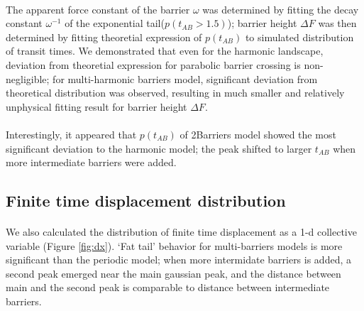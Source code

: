 \documentclass[11pt, a4paper]{article}
\begin{document}
\paragraph{}The apparent force constant of the barrier $\omega$ was determined by fitting the decay constant $\omega^{-1}$ of the exponential tail($p(t_{AB}>1.5)$); barrier height $\Delta F$ was
 then determined by fitting theoretial expression of $p(t_{AB})$ to simulated distribution of transit times. We demonstrated that even for the harmonic landscape, deviation from theoretial expression for parabolic barrier crossing is
 non-negligible; for multi-harmonic barriers model, significant deviation from theoretical distribution was observed, resulting in much smaller and relatively unphysical fitting result for barrier height $\Delta F$.

\paragraph{}Interestingly, it appeared that $p(t_{AB})$ of 2Barriers model showed the most significant deviation to the harmonic model; the peak shifted to larger $t_{AB}$ when more intermediate barriers were added.

\subsection{Finite time displacement distribution}

\paragraph{}We also calculated the distribution of finite time displacement as a 1-d collective variable (Figure \ref{fig:dx}). `Fat tail' behavior for multi-barriers models is more significant than the periodic model; when more intermidate barriers is added,
 a second peak emerged near the main gaussian peak, and the distance between main and the second peak is comparable to distance between intermediate barriers.
\end{document}
